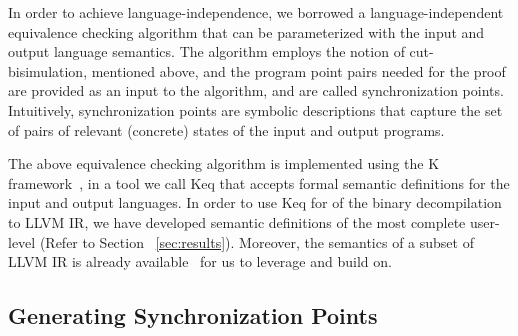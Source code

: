  In order to achieve language-independence, we borrowed a
 language-independent equivalence checking algorithm that can be parameterized
 with the input and output language semantics. The algorithm employs the notion
 of cut-bisimulation, mentioned above, and the program point pairs needed for
 the proof are provided as an input to the algorithm, and are called
 synchronization points. Intuitively, synchronization points are symbolic
 descriptions that capture the set of pairs of relevant (concrete) states of
 the input and output programs.
 
 The above equivalence checking algorithm is implemented using the K
 framework~\cite{k-primer-2013-v32}, in a tool we call Keq that accepts formal
 semantic definitions for the input and output languages. In order to use Keq
 for \TV of the binary decompilation to LLVM IR, we have developed \K semantic
 definitions of the most complete user-level \ISA (Refer to Section
     ~\ref{sec:results}). Moreover, the semantics of a subset of LLVM IR is
 already available~\cite{LLVMSEMA} for us to leverage and build on. 
 
 \subsection{Generating Synchronization Points}
